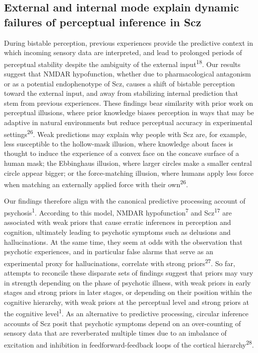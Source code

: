 \documentclass[
]{article}
\begin{document}
\subsection{External and internal mode explain dynamic failures of
perceptual inference in
Scz}\label{external-and-internal-mode-explain-dynamic-failures-of-perceptual-inference-in-scz}

During bistable perception, previous experiences provide the predictive
context in which incoming sensory data are interpreted, and lead to
prolonged periods of perceptual stability despite the ambiguity of the
external input\textsuperscript{18}. Our results suggest that NMDAR
hypofunction, whether due to pharmacological antagonism or as a
potential endophenotype of Scz, causes a shift of bistable perception
toward the external input, and away from stabilizing internal prediction
that stem from previous experiences. These findings bear similarity with
prior work on perceptual illusions, where prior knowledge biases
perception in ways that may be adaptive in natural environments but
reduce perceptual accuracy in experimental settings\textsuperscript{26}.
Weak predictions may explain why people with Scz are, for example, less
susceptible to the hollow-mask illusion, where knowledge about faces is
thought to induce the experience of a convex face on the concave surface
of a human mask; the Ebbinghaus illusion, where larger circles make a
smaller central circle appear bigger; or the force-matching illusion,
where humans apply less force when matching an externally applied force
with their own\textsuperscript{26}.

Our findings therefore align with the canonical predictive processing
account of psychosis\textsuperscript{1}. According to this model, NMDAR
hypofunction\textsuperscript{7} and Scz\textsuperscript{17} are
associated with weak priors that cause erratic inferences in perception
and cognition, ultimately leading to psychotic symptoms such as
delusions and hallucinations. At the same time, they seem at odds with
the observation that psychotic experiences, and in particular false
alarms that serve as an experimental proxy for hallucinations, correlate
with strong priors\textsuperscript{27}. So far, attempts to reconcile
these disparate sets of findings suggest that priors may vary in
strength depending on the phase of psychotic illness, with weak priors
in early stages and strong priors in later stages, or depending on their
position within the cognitive hierarchy, with weak priors at the
perceptual level and strong priors at the cognitive
level\textsuperscript{1}. As an alternative to predictive processing,
circular inference accounts of Scz posit that psychotic symptoms depend
on an over-counting of sensory data that are reverberated multiple times
due to an imbalance of excitation and inhibition in feedforward-feedback
loops of the cortical hierarchy\textsuperscript{28}.
\end{document}
